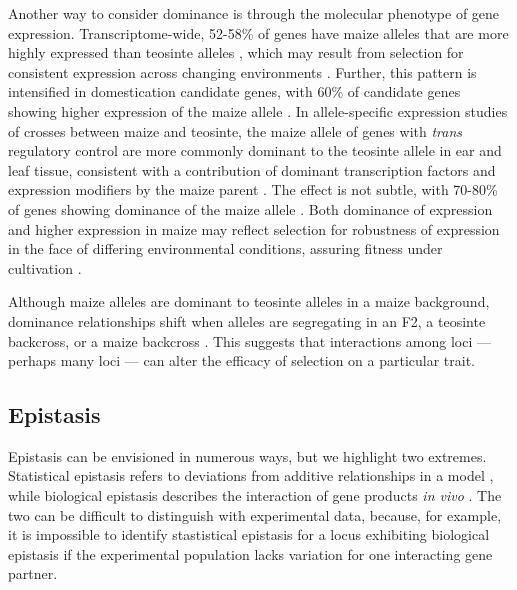 \documentclass[a4paper]{article}
\newcommand{\mcs}[1]{\todo[size=\tiny, color=magenta!20]{#1}}
\newcommand{\jri}[1]{\todo[size=\tiny, color=green!20]{#1}}
\begin{document}
﻿Another way to consider dominance is through the molecular phenotype of gene expression.
Transcriptome-wide, 52-58\% of genes have maize alleles that are more highly expressed than teosinte alleles \citep{hufford2012natgen, swansonwagner2012, lemmon2014eqtl, wang2017}, which may result from selection for consistent expression across changing environments \citep{doebley1995, lorant2017}.
Further, this pattern is intensified in domestication candidate genes, with 60\% of candidate genes showing higher expression of the maize allele \citep{hufford2012natgen, swansonwagner2012}.
﻿In allele-specific expression studies of crosses between maize and teosinte, the maize allele of genes with \textit{trans} regulatory control are more commonly dominant to the teosinte allele in ear and leaf tissue,  %
consistent with a contribution of dominant transcription factors and expression modifiers by the maize parent \citep{lemmon2014eqtl}.
The effect is not subtle, with 70-80\% of genes showing dominance of the maize allele \citep{lemmon2014eqtl}.
Both dominance of expression and higher expression in maize may reflect selection for robustness of expression in the face of differing environmental conditions, assuring fitness under cultivation \citep{doebley1995}.

﻿Although maize alleles are dominant to teosinte alleles in a maize background, dominance relationships shift when alleles are segregating in an F2, a teosinte backcross, or a maize backcross \citep{doebley1995, briggs2007, doust2014}.
This suggests that interactions among loci --- perhaps many loci --- can alter the efficacy of selection on a particular trait.

\subsection*{Epistasis}

﻿Epistasis can be envisioned in numerous ways, but we highlight two extremes.
Statistical epistasis refers to deviations from additive relationships in a model \citep{fisher1918}, while biological epistasis describes the interaction of gene products \textit{in vivo} \citep{bateson1909}.
﻿The two can be difficult to distinguish with experimental data, because, for example, it is impossible to identify stastistical epistasis for a locus exhibiting biological epistasis if the experimental population lacks variation for one interacting gene partner.
\end{document}
